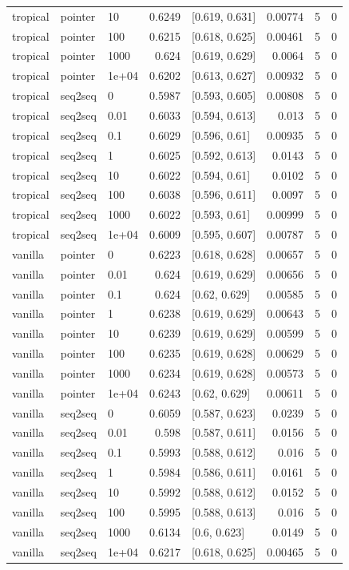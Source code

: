 \documentclass[10pt]{article}
\begin{document}
{\begin{longtable}{lllrlrrr}
tropical & pointer & 10 & 0.6249 & [0.619, 0.631] & 0.00774 & 5 & 0\\
tropical & pointer & 100 & 0.6215 & [0.618, 0.625] & 0.00461 & 5 & 0\\
tropical & pointer & 1000 & 0.624 & [0.619, 0.629] & 0.0064 & 5 & 0\\
tropical & pointer & 1e+04 & 0.6202 & [0.613, 0.627] & 0.00932 & 5 & 0\\
tropical & seq2seq & 0 & 0.5987 & [0.593, 0.605] & 0.00808 & 5 & 0\\
tropical & seq2seq & 0.01 & 0.6033 & [0.594, 0.613] & 0.013 & 5 & 0\\
tropical & seq2seq & 0.1 & 0.6029 & [0.596, 0.61] & 0.00935 & 5 & 0\\
tropical & seq2seq & 1 & 0.6025 & [0.592, 0.613] & 0.0143 & 5 & 0\\
tropical & seq2seq & 10 & 0.6022 & [0.594, 0.61] & 0.0102 & 5 & 0\\
tropical & seq2seq & 100 & 0.6038 & [0.596, 0.611] & 0.0097 & 5 & 0\\
tropical & seq2seq & 1000 & 0.6022 & [0.593, 0.61] & 0.00999 & 5 & 0\\
tropical & seq2seq & 1e+04 & 0.6009 & [0.595, 0.607] & 0.00787 & 5 & 0\\
vanilla & pointer & 0 & 0.6223 & [0.618, 0.628] & 0.00657 & 5 & 0\\
vanilla & pointer & 0.01 & 0.624 & [0.619, 0.629] & 0.00656 & 5 & 0\\
vanilla & pointer & 0.1 & 0.624 & [0.62, 0.629] & 0.00585 & 5 & 0\\
vanilla & pointer & 1 & 0.6238 & [0.619, 0.629] & 0.00643 & 5 & 0\\
vanilla & pointer & 10 & 0.6239 & [0.619, 0.629] & 0.00599 & 5 & 0\\
vanilla & pointer & 100 & 0.6235 & [0.619, 0.628] & 0.00629 & 5 & 0\\
vanilla & pointer & 1000 & 0.6234 & [0.619, 0.628] & 0.00573 & 5 & 0\\
vanilla & pointer & 1e+04 & 0.6243 & [0.62, 0.629] & 0.00611 & 5 & 0\\
vanilla & seq2seq & 0 & 0.6059 & [0.587, 0.623] & 0.0239 & 5 & 0\\
vanilla & seq2seq & 0.01 & 0.598 & [0.587, 0.611] & 0.0156 & 5 & 0\\
vanilla & seq2seq & 0.1 & 0.5993 & [0.588, 0.612] & 0.016 & 5 & 0\\
vanilla & seq2seq & 1 & 0.5984 & [0.586, 0.611] & 0.0161 & 5 & 0\\
vanilla & seq2seq & 10 & 0.5992 & [0.588, 0.612] & 0.0152 & 5 & 0\\
vanilla & seq2seq & 100 & 0.5995 & [0.588, 0.613] & 0.016 & 5 & 0\\
vanilla & seq2seq & 1000 & 0.6134 & [0.6, 0.623] & 0.0149 & 5 & 0\\
vanilla & seq2seq & 1e+04 & 0.6217 & [0.618, 0.625] & 0.00465 & 5 & 0\\
\bottomrule
\end{longtable}
}
\end{document}
